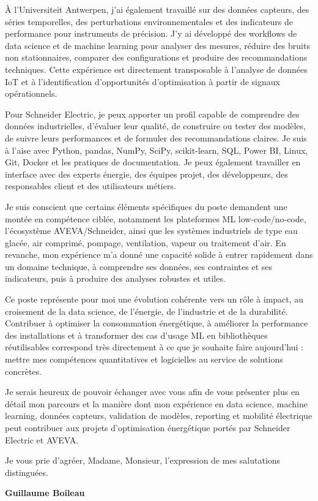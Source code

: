 \documentclass[11pt,a4paper]{altacv}
\begin{document}
{À l'Universiteit Antwerpen, j'ai également travaillé sur des données capteurs, des séries temporelles, des perturbations environnementales et des indicateurs de performance pour instruments de précision. J'y ai développé des workflows de data science et de machine learning pour analyser des mesures, réduire des bruits non stationnaires, comparer des configurations et produire des recommandations techniques. Cette expérience est directement transposable à l'analyse de données IoT et à l'identification d'opportunités d'optimisation à partir de signaux opérationnels.

Pour Schneider Electric, je peux apporter un profil capable de comprendre des données industrielles, d'évaluer leur qualité, de construire ou tester des modèles, de suivre leurs performances et de formuler des recommandations claires. Je suis à l'aise avec Python, pandas, NumPy, SciPy, scikit-learn, SQL, Power BI, Linux, Git, Docker et les pratiques de documentation. Je peux également travailler en interface avec des experts énergie, des équipes projet, des développeurs, des responsables client et des utilisateurs métiers.

Je suis conscient que certains éléments spécifiques du poste demandent une montée en compétence ciblée, notamment les plateformes ML low-code/no-code, l'écosystème AVEVA/Schneider, ainsi que les systèmes industriels de type eau glacée, air comprimé, pompage, ventilation, vapeur ou traitement d'air. En revanche, mon expérience m'a donné une capacité solide à entrer rapidement dans un domaine technique, à comprendre ses données, ses contraintes et ses indicateurs, puis à produire des analyses robustes et utiles.

Ce poste représente pour moi une évolution cohérente vers un rôle à impact, au croisement de la data science, de l'énergie, de l'industrie et de la durabilité. Contribuer à optimiser la consommation énergétique, à améliorer la performance des installations et à transformer des cas d'usage ML en bibliothèques réutilisables correspond très directement à ce que je souhaite faire aujourd'hui : mettre mes compétences quantitatives et logicielles au service de solutions concrètes.

Je serais heureux de pouvoir échanger avec vous afin de vous présenter plus en détail mon parcours et la manière dont mon expérience en data science, machine learning, données capteurs, validation de modèles, reporting et mobilité électrique peut contribuer aux projets d'optimisation énergétique portés par Schneider Electric et AVEVA.

Je vous prie d'agréer, Madame, Monsieur, l'expression de mes salutations distinguées.

\textbf{Guillaume Boileau}

}
\end{document}
